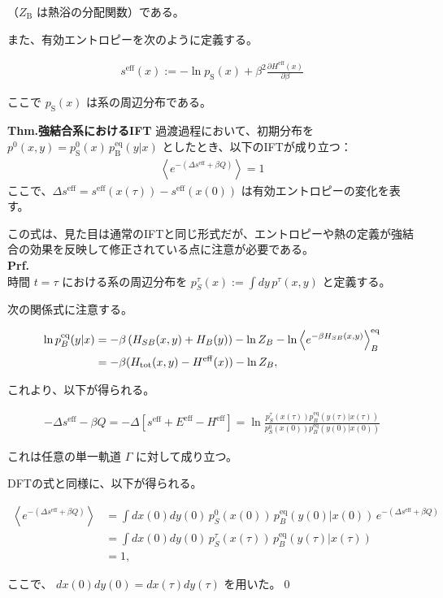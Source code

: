 \documentclass[a4paper,11pt]{jsarticle}
\numberwithin{equation}{section}
\begin{document}
（$Z_{\text{B}}$ は熱浴の分配関数）である。

また、有効エントロピーを次のように定義する。

\begin{align}
s^{\mathrm{eff}}(x)
:= - \ln p_{\text{S}}(x) + \beta^2 \frac{\partial H^{\mathrm{eff}}(x)}{\partial \beta}
\end{align}

ここで $p_{\text{S}}(x)$ は系の周辺分布である。

\begin{itembox}[l]{\textbf{Thm.強結合系におけるIFT}}
過渡過程において、初期分布を $p^0(x, y) = p_{\text{S}}^0(x)\, p_{\text{B}}^{\mathrm{eq}}(y | x)$ としたとき、以下のIFTが成り立つ：
\begin{align}
\left\langle e^{ -(\Delta s^{\mathrm{eff}} + \beta Q) } \right\rangle = 1
\end{align}
ここで、$\Delta s^{\mathrm{eff}} = s^{\mathrm{eff}}(x(\tau)) - s^{\mathrm{eff}}(x(0))$ は有効エントロピーの変化を表す。
\end{itembox}
この式は、見た目は通常のIFTと同じ形式だが、エントロピーや熱の定義が強結合の効果を反映して修正されている点に注意が必要である。\\
\textbf{Prf.}\\
時間 $t = \tau$ における系の周辺分布を $p_S^\tau(x) := \int dy\, p^\tau(x, y)$ と定義する。

次の関係式に注意する。

\begin{align}
\ln p_B^{\mathrm{eq}}(y | x) &= -\beta \left( H_{SB}(x, y) + H_B(y) \right) - \ln Z_B 
- \ln \left\langle e^{-\beta H_{SB}(x, y)} \right\rangle^{\mathrm{eq}}_B \notag \\
&= -\beta (H_{\mathrm{tot}}(x, y) - H^{\mathrm{eff}}(x)) - \ln Z_B,
\end{align}

これより、以下が得られる。

\begin{align}
-\Delta s^{\mathrm{eff}} - \beta Q 
= - \Delta \left[ s^{\mathrm{eff}} + E^{\mathrm{eff}} - H^{\mathrm{eff}} \right]
= \ln \frac{ p_S^{\tau}(x(\tau)) p_B^{\mathrm{eq}}(y(\tau) | x(\tau)) }{ p_S^0(x(0)) p_B^{\mathrm{eq}}(y(0) | x(0)) }
\end{align}

これは任意の単一軌道 $\Gamma$ に対して成り立つ。

DFTの式と同様に、以下が得られる。

\begin{align}
\left\langle e^{- ( \Delta s^{\mathrm{eff}} + \beta Q )} \right\rangle 
&= \int dx(0) dy(0)\, p_S^0(x(0))\, p_B^{\mathrm{eq}}(y(0) | x(0))\, e^{ - ( \Delta s^{\mathrm{eff}} + \beta Q ) } \\
&= \int dx(0) dy(0)\, p_S^\tau(x(\tau))\, p_B^{\mathrm{eq}}(y(\tau) | x(\tau)) \\
&= 1,
\end{align}

ここで、 $dx(0) dy(0) = dx(\tau) dy(\tau)$ を用いた。\qed\\
\end{document}
